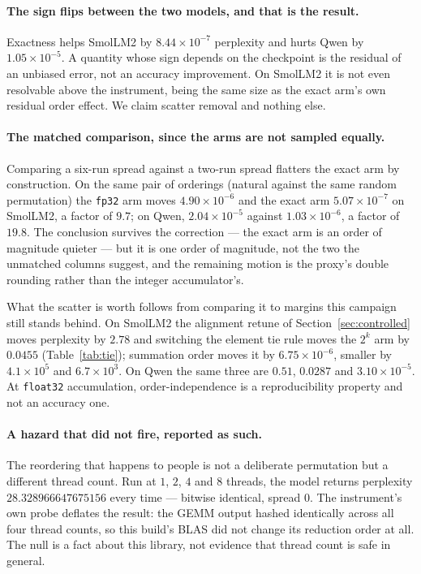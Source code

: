 \documentclass[11pt]{article}
\theoremstyle{definition}
\begin{document}
\paragraph{The sign flips between the two models, and that is the result.}
Exactness helps SmolLM2 by $8.44\times10^{-7}$ perplexity and hurts Qwen by
$1.05\times10^{-5}$. A quantity whose sign depends on the checkpoint is the
residual of an unbiased error, not an accuracy improvement. On SmolLM2 it is not
even resolvable above the instrument, being the same size as the exact arm's own
residual order effect. We claim scatter removal and nothing else.

\paragraph{The matched comparison, since the arms are not sampled equally.}
Comparing a six-run spread against a two-run spread flatters the exact arm by
construction. On the same pair of orderings (natural against the same random
permutation) the \texttt{fp32} arm moves $4.90\times10^{-6}$ and the exact arm
$5.07\times10^{-7}$ on SmolLM2, a factor of $9.7$; on Qwen,
$2.04\times10^{-5}$ against $1.03\times10^{-6}$, a factor of $19.8$. The
conclusion survives the correction --- the exact arm is an order of magnitude
quieter --- but it is one order of magnitude, not the two the unmatched columns
suggest, and the remaining motion is the proxy's double rounding rather than the
integer accumulator's.

What the scatter is worth follows from comparing it to margins this campaign
still stands behind. On SmolLM2 the alignment retune of Section~\ref{sec:controlled}
moves perplexity by $2.78$ and switching the element tie rule moves the $2^{k}$
arm by $0.0455$ (Table~\ref{tab:tie}); summation order moves it by
$6.75\times10^{-6}$, smaller by $4.1\times10^{5}$ and $6.7\times10^{3}$. On Qwen
the same three are $0.51$, $0.0287$ and $3.10\times10^{-5}$. At \texttt{float32}
accumulation, order-independence is a reproducibility property and not an
accuracy one.

\paragraph{A hazard that did not fire, reported as such.} The reordering that
happens to people is not a deliberate permutation but a different thread count.
Run at $1$, $2$, $4$ and $8$ threads, the model returns perplexity
$28.328966647675156$ every time --- bitwise identical, spread $0$. The
instrument's own probe deflates the result: the GEMM output hashed identically
across all four thread counts, so this build's BLAS did not change its reduction
order at all. The null is a fact about this library, not evidence that thread
count is safe in general.
\end{document}

